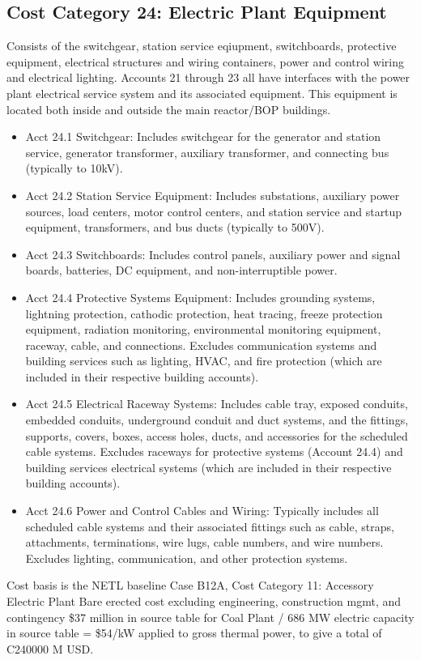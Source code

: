 
\subsection{Cost Category 24: Electric Plant Equipment}
Consists of the switchgear, station service eqiupment, switchboards, protective equipment, electrical structures and 
wiring containers, power and control wiring and electrical lighting.  Accounts 21 through 23 all have interfaces with the power plant electrical service system and its associated equipment. This equipment is located both inside
and outside the main reactor/BOP buildings.

\begin{itemize}

\item Acct 24.1 Switchgear: Includes switchgear for the generator and station service, generator
transformer, auxiliary transformer, and connecting bus (typically to 10kV).

\item  Acct 24.2 Station Service Equipment: Includes substations, auxiliary power sources, load
centers, motor control centers, and station service and startup equipment,
transformers, and bus ducts (typically to 500V).

\item  Acct 24.3 Switchboards: Includes control panels, auxiliary power and signal boards,
batteries, DC equipment, and non-interruptible power.

\item  Acct 24.4 Protective Systems Equipment: Includes grounding systems, lightning
protection, cathodic protection, heat tracing, freeze protection equipment,
radiation monitoring, environmental monitoring equipment, raceway, cable, and
connections. Excludes communication systems and building
services such as lighting, HVAC, and fire protection (which are included in their
respective building accounts).

\item  Acct 24.5 Electrical Raceway Systems: Includes cable tray, exposed conduits, embedded
conduits, underground conduit and duct systems, and the fittings, supports,
covers, boxes, access holes, ducts, and accessories for the scheduled cable
systems. Excludes raceways for protective systems (Account 24.4) and building
services electrical systems (which are included in their respective building
accounts).

\item  Acct 24.6 Power and Control Cables and Wiring: Typically includes all scheduled cable
systems and their associated fittings such as cable, straps, attachments,
terminations, wire lugs, cable numbers, and wire numbers. Excludes lighting,
communication, and other protection systems.

\end{itemize}

Cost basis is the NETL baseline Case B12A, Cost Category 11: Accessory Electric Plant Bare erected cost excluding engineering, construction mgmt, and
contingency \$37 million in source table for Coal Plant / 686 MW electric capacity in source table = \$54/kW applied to gross 
thermal power, to give a total of C240000 M USD.